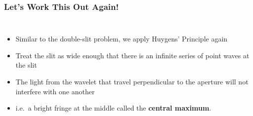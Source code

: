 \documentclass[compress,aspectratio=169]{beamer}
\begin{document}
\begin{frame}
  \frametitle{Let's Work This Out Again!}
  \begin{columns}
    \begin{itemize}
    \item Similar to the double-slit problem, we apply Huygens' Principle
      again
    \item Treat the slit as wide enough that there is an infinite series of
      point waves at the slit
    \item The light from the wavelet that travel perpendicular to the aperture
      will not interfere with one another
    \item i.e.\ a bright fringe at the middle called the
      \textbf{central maximum}.
    \end{itemize}
  \end{columns}
\end{frame}
\end{document}
